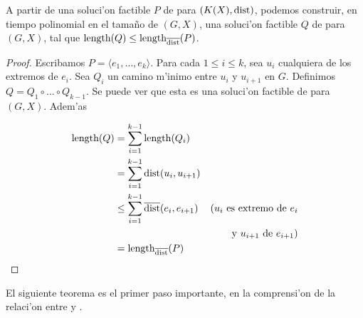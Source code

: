 \begin{lemma}
\label{le:ptsp_clients_to_sr}
A partir de una soluci'on factible $P$ de  para $(K(X), \textnormal{dist})$, podemos construir, en tiempo polinomial en el tama\~no de $(G, X)$, una soluci'on factible $Q$ de  para $(G, X)$, tal que $\textnormal{length}(Q) \leq \textnormal{length}_{\overline{\textnormal{dist}}}(P)$.

\begin{proof}
Escribamos $P = \langle e_1, \dots, e_k \rangle$. Para cada $1 \leq i \leq k$, sea $u_i$ cualquiera de los extremos de $e_i$. Sea $Q_i$ un camino m'inimo entre $u_i$ y $u_{i + 1}$ en $G$. Definimos $Q = Q_1 \circ \dots \circ Q_{k - 1}$. Se puede ver que esta es una soluci'on factible de  para $(G, X)$. Adem'as

\begin{align*}
\textnormal{length}(Q) &= \sum_{i = 1}^{k - 1} \textnormal{length}(Q_i) &\\
&= \sum_{i = 1}^{k - 1} \textnormal{dist}(u_i, u_{i + 1}) &\\
&\leq \sum_{i = 1}^{k - 1} \overline{\textnormal{dist}}(e_i, e_{i + 1}) & \text{(} u_i \text{ es extremo de } e_i \\
& & \text{y } u_{i + 1} \text{ de } e_{i + 1} \text{)}\\
&= \textnormal{length}_{\overline{\textnormal{dist}}}(P)
\end{align*}
\end{proof}
\end{lemma}

El siguiente teorema es el primer paso importante, en la comprensi'on de la relaci'on entre  y .


